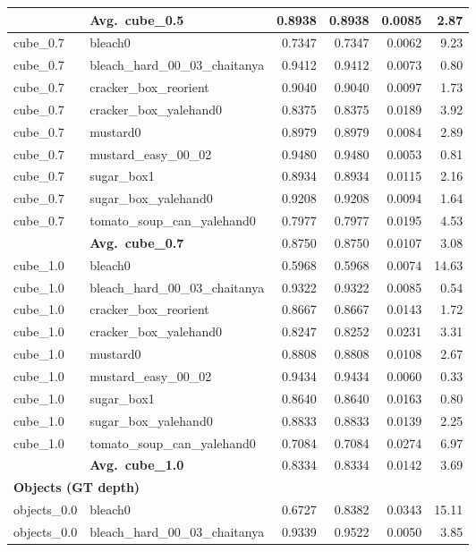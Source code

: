 \begin{longtable}{llrrrr}
  & \textbf{Avg.~cube_0.5} & 0.8938 & 0.8938 & 0.0085 & 2.87 \\
  \midrule
  cube_0.7 & bleach0 & 0.7347 & 0.7347 & 0.0062 & 9.23 \\
  cube_0.7 & bleach\_hard\_00\_03\_chaitanya & 0.9412 & 0.9412 & 0.0073 & 0.80 \\
  cube_0.7 & cracker\_box\_reorient & 0.9040 & 0.9040 & 0.0097 & 1.73 \\
  cube_0.7 & cracker\_box\_yalehand0 & 0.8375 & 0.8375 & 0.0189 & 3.92 \\
  cube_0.7 & mustard0 & 0.8979 & 0.8979 & 0.0084 & 2.89 \\
  cube_0.7 & mustard\_easy\_00\_02 & 0.9480 & 0.9480 & 0.0053 & 0.81 \\
  cube_0.7 & sugar\_box1 & 0.8934 & 0.8934 & 0.0115 & 2.16 \\
  cube_0.7 & sugar\_box\_yalehand0 & 0.9208 & 0.9208 & 0.0094 & 1.64 \\
  cube_0.7 & tomato\_soup\_can\_yalehand0 & 0.7977 & 0.7977 & 0.0195 & 4.53 \\
  \cmidrule{2-6}
  & \textbf{Avg.~cube_0.7} & 0.8750 & 0.8750 & 0.0107 & 3.08 \\
  \midrule
  cube_1.0 & bleach0 & 0.5968 & 0.5968 & 0.0074 & 14.63 \\
  cube_1.0 & bleach\_hard\_00\_03\_chaitanya & 0.9322 & 0.9322 & 0.0085 & 0.54 \\
  cube_1.0 & cracker\_box\_reorient & 0.8667 & 0.8667 & 0.0143 & 1.72 \\
  cube_1.0 & cracker\_box\_yalehand0 & 0.8247 & 0.8252 & 0.0231 & 3.31 \\
  cube_1.0 & mustard0 & 0.8808 & 0.8808 & 0.0108 & 2.67 \\
  cube_1.0 & mustard\_easy\_00\_02 & 0.9434 & 0.9434 & 0.0060 & 0.33 \\
  cube_1.0 & sugar\_box1 & 0.8640 & 0.8640 & 0.0163 & 0.80 \\
  cube_1.0 & sugar\_box\_yalehand0 & 0.8833 & 0.8833 & 0.0139 & 2.25 \\
  cube_1.0 & tomato\_soup\_can\_yalehand0 & 0.7084 & 0.7084 & 0.0274 & 6.97 \\
  \cmidrule{2-6}
  & \textbf{Avg.~cube_1.0} & 0.8334 & 0.8334 & 0.0142 & 3.69 \\
  \midrule
\multicolumn{6}{l}{\textbf{Objects (GT depth)}} \\
\midrule
  objects_0.0 & bleach0 & 0.6727 & 0.8382 & 0.0343 & 15.11 \\
  objects_0.0 & bleach\_hard\_00\_03\_chaitanya & 0.9339 & 0.9522 & 0.0050 & 3.85 \\

\end{longtable}
